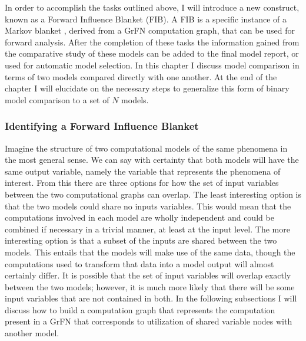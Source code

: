 In order to accomplish the tasks outlined above, I will introduce a new construct, known as a Forward Influence Blanket (FIB). A FIB is a specific instance of a Markov blanket \citep{pearl2009causality}, derived from a GrFN computation graph, that can be used for forward analysis.  %
After the completion of these tasks the information gained from the comparative study of these models can be added to the final model report, or used for automatic model selection. In this chapter I discuss model comparison in terms of two models compared directly with one another. At the end of the chapter I will elucidate on the necessary steps to generalize this form of binary model comparison to a set of $N$ models.

\subsubsection{Identifying a Forward Influence Blanket\label{sec:fib_creation}}
Imagine the structure of two computational models of the same phenomena in the most general sense. We can say with certainty that both models will have the same output variable, namely the variable that represents the phenomena of interest. From this there are three options for how the set of input variables between the two computational graphs can overlap. The least interesting option is that the two models could share no inputs variables. This would mean that the computations involved in each model are wholly independent and could be combined if necessary in a trivial manner, at least at the input level. The more interesting option is that a subset of the inputs are shared between the two models. This entails that the models will make use of the same data, though the computations used to transform that data into a model output will almost certainly differ. It is possible that the set of input variables will overlap exactly between the two models; however, it is much more likely that there will be some input variables that are not contained in both. In the following subsections I will discuss how to build a computation graph that represents the computation present in a GrFN that corresponds to utilization of shared variable nodes with another model.

